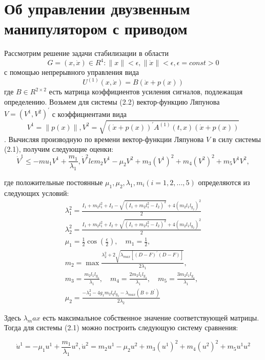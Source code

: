 \section{Об управлении двузвенным манипулятором с приводом} \label{p23}

Рассмотрим решение задачи стабилизации в области 
$$G = {(x, \dot x) \in R^4 : \|x\|<\epsilon, \|\dot x\|<\epsilon, \epsilon=const>0}$$
с помощью непрерывного управления вида
$$U^{(1)}(x, \dot x) = B(\dot x + p(x))$$ \label{2.3'}     
где $B \in R^{2 \times 2}$ есть матрица коэффициентов усиления сигналов, подлежащая определению.
Возьмем для системы (2.2) вектор-функцию Ляпунова $V = (V^1, V^2)^{'}$  с коэффициентами вида $$V^1 = \|p(x)\|, V^2 = \sqrt{(\dot x + p(x))^{'} A^{(1)}(t, x)(\dot x + p(x))}$$.
Вычисляя производную по времени вектор-функции Ляпунова $V$ в силу системы (2.1), получим следующие оценки:
$$ \dot V^1 \le -mu_1 V^1 + \frac{m_1}{\lambda_1}, \dot V^2 le m_2 V^1 - \mu_2 V^2 + m_3 (V^1)^2 + m_4 (V^2)^2 + m_5 V^1 V^2, $$

где положительные постоянные $\mu_1, \mu_2, \lambda_1, m_i (i=1,2,...,5)$ определяются из следующих условий:
$$
\begin{array}{l}
\displaystyle \lambda_1^2 = \frac{I_1 + m_2 l_1^2 + I_2 - \sqrt{(I_1 + m_2 l_1^2 - I_2)^2} + 4(m_2 l_1 l_{g_2})^2}{2}\\
\displaystyle \lambda_2^2 = \frac{I_1 + m_2 l_1^2 + I_2 + \sqrt{(I_1 + m_2 l_1^2 - I_2)^2} + 4(m_2 l_1 l_{g_2})^2}{2}\\
\mu_1 =\frac12 \cos(\frac{\epsilon}{2}), \quad m_1 = \frac12,\\
m_2 = \max \frac{\lambda_2^2 + 2 \sqrt{\lambda_{max} [(D-F)^{'} (D-F)]}}{2 \lambda_1},\\
m_3 = \frac{m_2 l_1 l_{g_2}}{\lambda_1}, \quad m_4 = \frac{2 m_2 l_1 l_{g_2}}{\lambda_1}, \quad m_5 = \frac{3 m_2 l_1 l_{g_2}}{\lambda_1},\\
\mu_2 = \frac{-\lambda_2^2 - 4 g_1 m_2 l_q l_{g_2} - \lambda_{max} (B + B^{'})}{2 \lambda_2}
\end{array}
$$

Здесь $\lambda_max$ есть максимальное собственное значение соответствующей матрицы. 
Тогда для системы (2.1) можно построить следующую систему сравнения:

\begin{equation}\label{2.4'}
\dot u^1 = - \mu_1 u^1 + \frac{m_1}{\lambda_1} u^2, \dot u^2 = m_2 u^1 - \mu_2 u^2 + m_3 (u^1)^2 + m_4(u^2)^2 + m_5 u^1 u^2
\end{equation}

